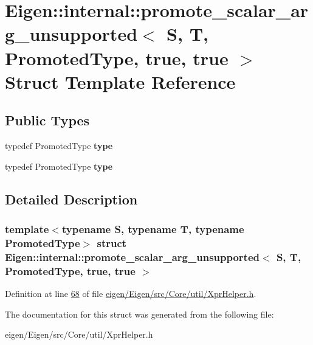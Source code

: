 \hypertarget{struct_eigen_1_1internal_1_1promote__scalar__arg__unsupported_3_01_s_00_01_t_00_01_promoted_type_00_01true_00_01true_01_4}{}\section{Eigen\+:\+:internal\+:\+:promote\+\_\+scalar\+\_\+arg\+\_\+unsupported$<$ S, T, Promoted\+Type, true, true $>$ Struct Template Reference}
\label{struct_eigen_1_1internal_1_1promote__scalar__arg__unsupported_3_01_s_00_01_t_00_01_promoted_type_00_01true_00_01true_01_4}
\subsection*{Public Types}
\begin{DoxyCompactItemize}
\item 
\mbox{\label{struct_eigen_1_1internal_1_1promote__scalar__arg__unsupported_3_01_s_00_01_t_00_01_promoted_type_00_01true_00_01true_01_4_a64364a92b21177220b54217e88f1703d}} 
typedef Promoted\+Type {\bfseries type}
\item 
\mbox{\label{struct_eigen_1_1internal_1_1promote__scalar__arg__unsupported_3_01_s_00_01_t_00_01_promoted_type_00_01true_00_01true_01_4_a64364a92b21177220b54217e88f1703d}} 
typedef Promoted\+Type {\bfseries type}
\end{DoxyCompactItemize}


\subsection{Detailed Description}
\subsubsection*{template$<$typename S, typename T, typename Promoted\+Type$>$\newline
struct Eigen\+::internal\+::promote\+\_\+scalar\+\_\+arg\+\_\+unsupported$<$ S, T, Promoted\+Type, true, true $>$}



Definition at line \hyperlink{eigen_2_eigen_2src_2_core_2util_2_xpr_helper_8h_source_l00068}{68} of file \hyperlink{eigen_2_eigen_2src_2_core_2util_2_xpr_helper_8h_source}{eigen/\+Eigen/src/\+Core/util/\+Xpr\+Helper.\+h}.



The documentation for this struct was generated from the following file\+:\begin{DoxyCompactItemize}
\item 
eigen/\+Eigen/src/\+Core/util/\+Xpr\+Helper.\+h\end{DoxyCompactItemize}
